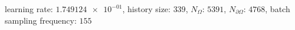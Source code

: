learning rate: $\num[scientific-notation=true]{1.749124e-01}$, history size: $\num[scientific-notation=false]{339}$, $N_{\Omega}$: $\num[scientific-notation=false]{5391}$, $N_{\partial\Omega}$: $\num[scientific-notation=false]{4768}$, batch sampling frequency: $\num[scientific-notation=false]{155}$